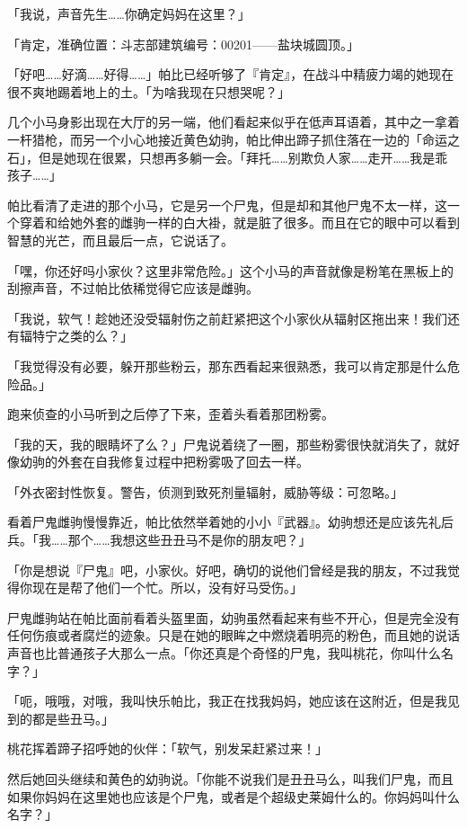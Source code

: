 「我说，声音先生……你确定妈妈在这里？」

「{\mt 肯定，准确位置：斗志部建筑编号：00201——盐块城圆顶。}」

「好吧……好滴……好得……」帕比已经听够了『肯定』，在战斗中精疲力竭的她现在很不爽地踢着地上的土。「为啥我现在只想哭呢？」

几个小马身影出现在大厅的另一端，他们看起来似乎在低声耳语着，其中之一拿着一杆猎枪，而另一个小心地接近黄色幼驹，帕比伸出蹄子抓住落在一边的「命运之石」，但是她现在很累，只想再多躺一会。「拜托……别欺负人家……走开……我是乖孩子……」

帕比看清了走进的那个小马，它是另一个尸鬼，但是却和其他尸鬼不太一样，这一个穿着和给她外套的雌驹一样的白大褂，就是脏了很多。而且在它的眼中可以看到智慧的光芒，而且最后一点，它说话了。

「嘿，你还好吗小家伙？这里非常危险。」这个小马的声音就像是粉笔在黑板上的刮擦声音，不过帕比依稀觉得它应该是雌驹。

「我说，软气！趁她还没受辐射伤之前赶紧把这个小家伙从辐射区拖出来！我们还有辐特宁之类的么？」

「我觉得没有必要，躲开那些粉云，那东西看起来很熟悉，我可以肯定那是什么危险品。」

跑来侦查的小马听到之后停了下来，歪着头看着那团粉雾。

「我的天，我的眼睛坏了么？」尸鬼说着绕了一圈，那些粉雾很快就消失了，就好像幼驹的外套在自我修复过程中把粉雾吸了回去一样。

「{\mt 外衣密封性恢复。警告，侦测到致死剂量辐射，威胁等级：可忽略。}」

看着尸鬼雌驹慢慢靠近，帕比依然举着她的小小『武器』。幼驹想还是应该先礼后兵。「我……那个……我想这些丑丑马不是你的朋友吧？」

「你是想说『尸鬼』吧，小家伙。好吧，确切的说他们曾经是我的朋友，不过我觉得你现在是帮了他们一个忙。所以，没有好马受伤。」

尸鬼雌驹站在帕比面前看着头盔里面，幼驹虽然看起来有些不开心，但是完全没有任何伤痕或者腐烂的迹象。只是在她的眼眸之中燃烧着明亮的粉色，而且她的说话声音也比普通孩子大那么一点。「你还真是个奇怪的尸鬼，我叫桃花，你叫什么名字？」

「呃，哦哦，对哦，我叫快乐帕比，我正在找我妈妈，她应该在这附近，但是我见到的都是些丑马。」

桃花挥着蹄子招呼她的伙伴：「软气，别发呆赶紧过来！」

然后她回头继续和黄色的幼驹说。「你能不说我们是丑丑马么，叫我们尸鬼，而且如果你妈妈在这里她也应该是个尸鬼，或者是个超级史莱姆什么的。你妈妈叫什么名字？」


